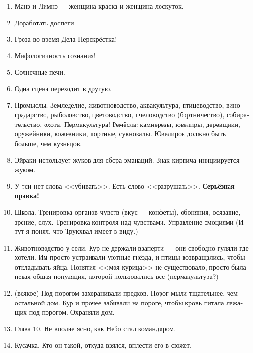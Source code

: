 \documentclass[a4paper,12pt,fleqn]{book}\usepackage{cooltooltips}\usepackage{polyglossia}\setdefaultlanguage[babelshorthands=true]{russian}\setotherlanguage{english}\defaultfontfeatures{Ligatures=TeX,Mapping=tex-text} \usepackage{xcolor}\definecolor{lightgray}{HTML}{bbbbbb}\color{lightgray}\newcommand{\ml}[3]{\textenglish{\textcolor{black}{#3}}}
\begin{document}
{\begin{enumerate}
\item Манэ и Лимнэ --- женщина-краска и женщина-лоскуток.

\item Доработать доспехи.

\item Гроза во время Дела Перекрёстка!

\item Мифологичность сознания!

\item Солнечные печи.

\item Одна сцена переходит в другую.

\item Промыслы.
Земледелие, животноводство, аквакультура, птицеводство, виноградарство, рыболовство, цветоводство, пчеловодство (бортничество), собирательство, охота.
Пермакультура!
Ремёсла: камнерезы, ювелиры, деревщики, оружейники, кожевники, портные, сукновалы.
Ювелиров должно быть больше, чем кузнецов.

\item Эйраки использует жуков для сбора эманаций.
Знак кирпича инициируется жуком.

\item У тси нет слова <<убивать>>.
Есть слово <<разрушать>>.
\textbf{Серьёзная правка!}

\item Школа.
Тренировка органов чувств (вкус --- конфеты), обоняния, осязание, зрение, слух.
Тренировка контроля над чувствами.
Управление эмоциями (И тут я понял, что Трукхвал имеет в виду.)

\item Животноводство у сели.
Кур не держали взаперти --- они свободно гуляли где хотели.
Им просто устраивали уютные гнёзда, и птицы возвращались, чтобы откладывать яйца.
Понятия <<моя курица>> не существовало, просто была некая общая популяция, которой пользовались все (пермакультура?)

\item (всякое) Под порогом захоранивали предков.
Порог мыли тщательнее, чем остальной дом.
Кур и прочее забивали на пороге, чтобы кровь питала лежащих под порогом.
Охраняли дом.

\item Глава 10.
Не вполне ясно, как Небо стал командиром.

\item Кусачка.
Кто он такой, откуда взялся, вплести его в сюжет.


\end{enumerate}}
\end{document}
